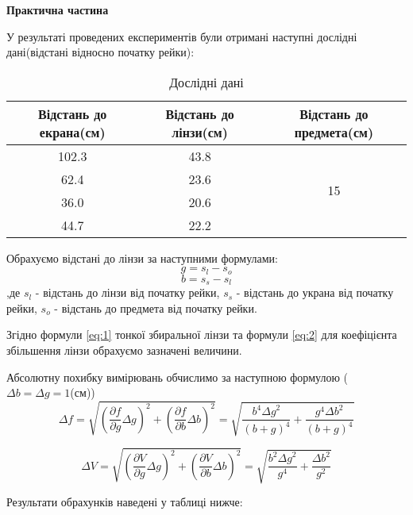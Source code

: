 \begin{center}
    \Large{\textbf{Практична частина}}
\end{center}

\vspace{1mm}

У результаті проведених експериментів 
були отримані наступні дослідні дані(відстані відносно початку рейки):
\begin{table}[h] \label{table:raw}
    \centering
    \begin{tabular}{ |c|c|c| }
        \hline 
        \textbf{Відстань до екрана(см)} & \textbf{Відстань до лінзи(см)} & \textbf{Відстань до предмета(см)} \\
        \hline
        102.3 & 43.8 & \multirow{4}{*}{15} \\
        \cline{1-2}
        62.4 & 23.6 & \\
        \cline{1-2}
        36.0 & 20.6 & \\
        \cline{1-2}
        44.7 & 22.2 & \\
        \hline
    \end{tabular}
    \caption{Дослідні дані}
\end{table}


Обрахуємо відстані до лінзи за наступними формулами:
$$ g = s_l - s_o $$
$$ b = s_s - s_l $$
,де $s_l$ - відстань до лінзи від початку рейки,
$s_s$ - відстань до украна від початку рейки,
$s_o$ - відстань до предмета від початку рейки.

Згідно формули \ref{eq:1} тонкої збиральної лінзи 
та формули \ref{eq:2} для коефіцієнта збільшення лінзи обрахуємо
зазначені величини. 

Абсолютну похибку вимірювань обчислимо за наступною формулою ($\Delta b = \Delta g = 1$(см))
$$ \Delta f = \sqrt{ \left( \frac{\partial{f}}{ \partial{g} } \Delta g \right)^2 +
\left( \frac{\partial{f}}{ \partial{b} } \Delta b \right)^2 } = 
\sqrt{ \frac{b^4 {\Delta g}^2}{ (b+g)^4 } + \frac{g^4 {\Delta b}^2}{ (b+g)^4 } } $$

$$ \Delta V = \sqrt{ \left( \frac{\partial{V}}{ \partial{g} } \Delta g \right)^2 +
\left( \frac{\partial{V}}{ \partial{b} } \Delta b \right)^2 } =
\sqrt{ \frac{b^2 {\Delta g}^2}{ g^4 } + \frac{{\Delta b}^2}{ g^2 } } $$

Результати обрахунків наведені у таблиці нижче:


